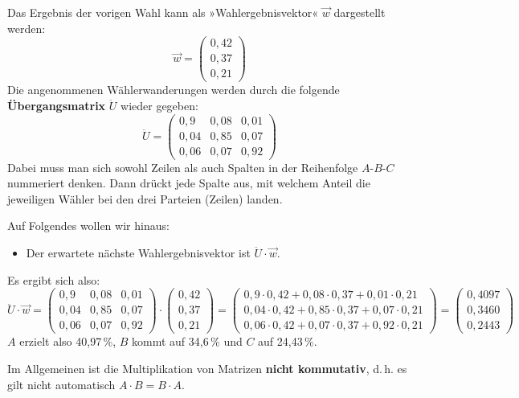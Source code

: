 Das Ergebnis der vorigen Wahl kann als »Wahlergebnisvektor« $\vec{w}$ dargestellt werden:
\[ \vec{w} = \begin{pmatrix} 0{,}42 \\ 0{,}37 \\ 0{,}21 \end{pmatrix} \]
Die angenommenen Wählerwanderungen werden durch die folgende \textbf{Übergangsmatrix} $\ddot{U}$ wieder gegeben:
\[ \ddot{U} = \begin{pmatrix} 0{,}9 & 0{,}08 & 0{,}01 \\ 0{,}04 & 0{,}85 & 0{,}07 \\ 0{,}06 & 0{,}07 & 0{,}92 \end{pmatrix} \]
Dabei muss man sich sowohl Zeilen als auch Spalten in der Reihenfolge $A$-$B$-$C$ nummeriert denken. Dann drückt jede Spalte aus, mit welchem Anteil die jeweiligen Wähler bei den drei Parteien (Zeilen) landen.

Auf Folgendes wollen wir hinaus:
\begin{itemize}
  \item Der erwartete nächste Wahlergebnisvektor ist $\ddot{U} \cdot \vec{w}$.
\end{itemize}
Es ergibt sich also:
\[ \ddot{U} \cdot \vec{w} = \begin{pmatrix} 0{,}9 & 0{,}08 & 0{,}01 \\ 0{,}04 & 0{,}85 & 0{,}07 \\ 0{,}06 & 0{,}07 & 0{,}92 \end{pmatrix} \cdot \begin{pmatrix} 0{,}42 \\ 0{,}37 \\ 0{,}21 \end{pmatrix} = \begin{pmatrix} 0{,}9 \cdot 0{,}42 + 0{,}08 \cdot 0{,}37 + 0{,}01 \cdot 0{,}21 \\ 0{,}04 \cdot 0{,}42 + 0{,}85 \cdot 0{,}37 + 0{,}07 \cdot 0{,}21 \\ 0{,}06 \cdot 0{,}42 + 0{,}07 \cdot 0{,}37 + 0{,}92 \cdot 0{,}21 \end{pmatrix} = \begin{pmatrix} 0{,}4097 \\ 0{,}3460 \\ 0{,}2443 \end{pmatrix} \]
$A$ erzielt also 40{,}97\,\%, $B$ kommt auf 34{,}6\,\% und $C$ auf 24{,}43\,\%.\beispielende

Im Allgemeinen ist die Multiplikation von Matrizen \textbf{nicht kommutativ}, d.\,h. es gilt nicht automatisch $A \cdot B = B \cdot A$.

